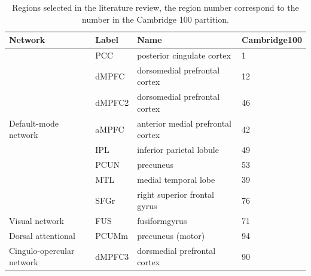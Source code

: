 

\begin{table}[H]
\begin{center}
\begin{tabular}{l l l l}
\bfseries{Network} & \bfseries{Label} & \bfseries{Name} & \bfseries{Cambridge100}\\
\hline
 & PCC & posterior cingulate cortex & 1\\
 & dMPFC & dorsomedial prefrontal cortex & 12\\
 & dMPFC2 & dorsomedial prefrontal cortex & 46\\
Default-mode network & aMPFC & anterior medial prefrontal cortex & 42\\
 & IPL & inferior parietal lobule & 49\\
 & PCUN & precuneus & 53\\
 & MTL & medial temporal lobe & 39\\
 & SFGr & right superior frontal gyrus & 76\\
\hline
Visual network & FUS & fusiformgyrus & 71\\
\hline
Dorsal attentional & PCUMm & precuneus (motor) & 94\\
\hline
Cingulo-opercular network & dMPFC3 & dorsmedial prefrontal cortex & 90\\
\end{tabular}
\end{center}
\caption{Regions selected in the literature review, the region number correspond to the number in the Cambridge 100 partition.}
\label{tab_point-to-point}
\end{table}

